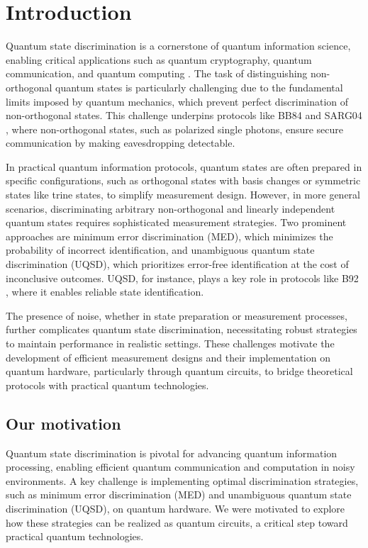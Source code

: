 
\chapter{Introduction}
\label{chap:intro}

Quantum state discrimination is a cornerstone of quantum information science,
enabling critical applications such as quantum cryptography, quantum
communication, and quantum computing \cite{bb84,RN492}.
The task of distinguishing non-orthogonal quantum states is particularly
challenging due to the fundamental limits imposed by quantum mechanics, which
prevent perfect discrimination of non-orthogonal states.
This challenge underpins protocols like BB84 \cite{bb84} and SARG04
\cite{RN492}, where non-orthogonal states, such as polarized single photons,
ensure secure communication by making eavesdropping detectable.

In practical quantum information protocols, quantum states are often prepared
in specific configurations, such as orthogonal states with basis changes or
symmetric states like trine states, to simplify measurement design.
However, in more general scenarios, discriminating arbitrary non-orthogonal
and linearly independent quantum states requires sophisticated measurement strategies.
Two prominent approaches are minimum error discrimination (MED), which
minimizes the probability of incorrect identification, and unambiguous quantum
state discrimination (UQSD), which prioritizes error-free identification at
the cost of inconclusive outcomes.
UQSD, for instance, plays a key role in protocols like B92 \cite{RN485}, where
it enables reliable state identification.

The presence of noise, whether in state preparation or measurement processes,
further complicates quantum state discrimination, necessitating robust
strategies to maintain performance in realistic settings.
These challenges motivate the development of efficient measurement designs and
their implementation on quantum hardware, particularly through quantum
circuits, to bridge theoretical protocols with practical quantum technologies.

\section{Our motivation}
Quantum state discrimination is pivotal for advancing quantum information
processing, enabling efficient quantum communication and computation in noisy environments.
A key challenge is implementing optimal discrimination strategies, such as
minimum error discrimination (MED) and unambiguous quantum state discrimination
(UQSD), on quantum hardware.
We were motivated to explore how these strategies can be realized as quantum
circuits, a critical step toward practical quantum technologies.

